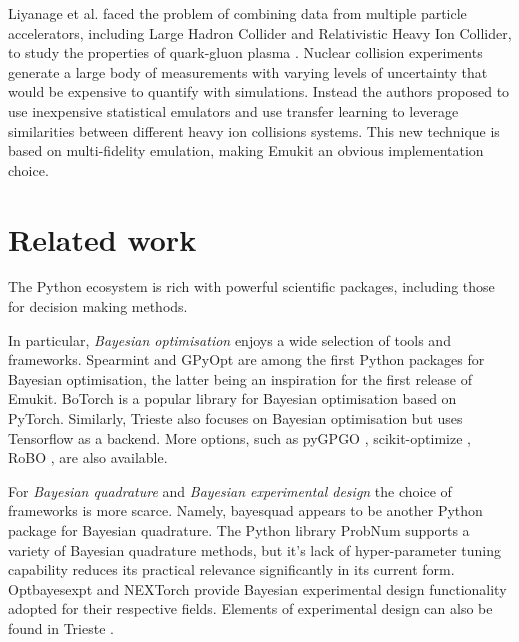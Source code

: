 Liyanage et al. faced the problem of combining data from multiple particle accelerators, including Large Hadron Collider and Relativistic Heavy Ion Collider, to study the properties of quark-gluon plasma \cite{PhysRevC105034910}. Nuclear collision experiments generate a large body of measurements with varying levels of uncertainty that would be expensive to quantify with simulations. Instead the authors proposed to use inexpensive statistical emulators and use transfer learning to leverage similarities between different heavy ion collisions systems. This new technique is based on multi-fidelity emulation, making Emukit an obvious implementation choice.

\section{Related work}
The Python ecosystem is rich with powerful scientific packages, including those for decision making methods.

In particular, \emph{Bayesian optimisation} enjoys a wide selection of tools and frameworks. Spearmint \cite{snoek2012practical} and GPyOpt \cite{gpyopt2016} are among the first Python packages for Bayesian optimisation, the latter being an inspiration for the first release of Emukit. BoTorch \cite{balandat2020botorch} is a popular library for Bayesian optimisation based on PyTorch. Similarly, Trieste \cite{picheny2023trieste} also focuses on Bayesian optimisation but uses Tensorflow as a backend. More options, such as pyGPGO \cite{jimenez2017pygpgo}, scikit-optimize \cite{louppe2017bayesian}, RoBO \cite{klein-bayesopt17}, are also available.

For \emph{Bayesian quadrature} and \emph{Bayesian experimental design} the choice of frameworks is more scarce. Namely, bayesquad \cite{Charles2013}  appears to be another Python package for Bayesian quadrature. The Python library ProbNum \cite{Wenger21} supports a variety of Bayesian quadrature methods, but it's lack of hyper-parameter tuning capability reduces its practical relevance significantly in its current form. Optbayesexpt \cite{mcmichael2021optbayesexpt} and NEXTorch \cite{wang2021nextorch} provide Bayesian experimental design functionality adopted for their respective fields. Elements of experimental design can also be found in Trieste \cite{picheny2023trieste}.

